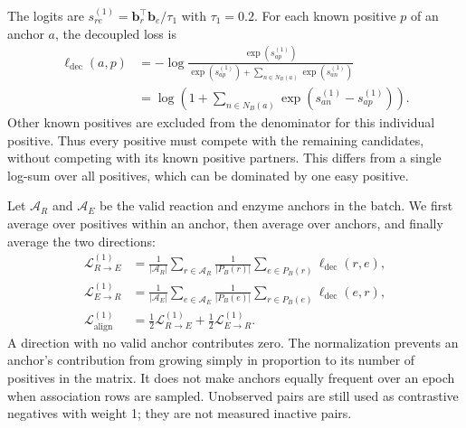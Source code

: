 The logits are $s_{re}^{(1)}=\mathbf{b}_r^\top \mathbf{b}_e/\tau_1$ with $\tau_1=0.2$. For each known positive $p$ of an anchor $a$, the
decoupled loss is
\begin{align}
  \ell_{\mathrm{dec}}(a,p)
   &=-\log\frac{\exp(s_{ap}^{(1)})}
       {\exp(s_{ap}^{(1)})+\sum_{n\in N_B(a)}\exp(s_{an}^{(1)})}\\
   &=\log\left(1+\sum_{n\in N_B(a)}\exp(s_{an}^{(1)}-s_{ap}^{(1)})\right).
   \label{eq:v4-decoupled}
\end{align}
Other known positives are excluded from the denominator for this individual
positive. Thus every positive must compete with the remaining candidates,
without competing with its known positive partners. This differs from a
single log-sum over all positives, which can be dominated by one easy positive.

Let $\mathcal A_R$ and $\mathcal A_E$ be the valid reaction and enzyme anchors
in the batch. We first average over positives within an anchor, then average
over anchors, and finally average the two directions:
\begin{align}
  \mathcal L_{R\to E}^{(1)}
    &=\frac{1}{|\mathcal A_R|}\sum_{r\in\mathcal A_R}
      \frac{1}{|P_B(r)|}\sum_{e\in P_B(r)}\ell_{\mathrm{dec}}(r,e),\\
  \mathcal L_{E\to R}^{(1)}
    &=\frac{1}{|\mathcal A_E|}\sum_{e\in\mathcal A_E}
      \frac{1}{|P_B(e)|}\sum_{r\in P_B(e)}\ell_{\mathrm{dec}}(e,r),\\
  \mathcal L_{\mathrm{align}}^{(1)}
    &=\tfrac12\mathcal L_{R\to E}^{(1)}+
      \tfrac12\mathcal L_{E\to R}^{(1)}.
  \label{eq:v4-anchor-balanced}
\end{align}
A direction with no valid anchor contributes zero. The normalization prevents
an anchor's contribution from growing simply in proportion to its number of
positives in the matrix. It does not make anchors equally frequent over an
epoch when association rows are sampled. Unobserved pairs are still used as
contrastive negatives with weight 1; they are not measured inactive pairs.

